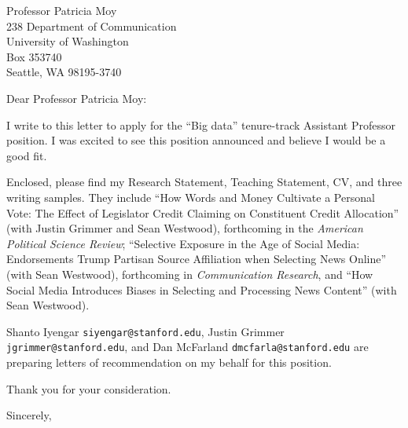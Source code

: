 \documentclass[fontsize=12pt, paper=a4]{scrlttr2}
\begin{document}
\begin{letter}{Professor Patricia Moy \\
238 Department of Communication\\
University of Washington\\
Box 353740\\
Seattle, WA 98195-3740}

\opening{Dear Professor Patricia Moy:}  %

I write to this letter to apply for the ``Big data'' tenure-track Assistant Professor position.  I was excited to see this position announced and believe I would be a good fit.   

Enclosed, please find my Research Statement, Teaching Statement, CV, and three writing samples.  They include ``How Words and Money Cultivate a Personal Vote: The Effect of Legislator Credit Claiming on Constituent Credit Allocation'' (with Justin Grimmer and Sean Westwood), forthcoming in the \emph{American Political Science Review};  ``Selective Exposure in the Age of Social Media: Endorsements Trump Partisan Source Affiliation when Selecting News Online'' (with Sean Westwood), forthcoming in \emph{Communication Research}, and ``How Social Media Introduces Biases in Selecting and Processing News Content'' (with Sean Westwood).  

Shanto Iyengar \texttt{siyengar@stanford.edu}, Justin Grimmer \texttt{jgrimmer@stanford.edu}, and Dan McFarland \texttt{dmcfarla@stanford.edu} are preparing letters of recommendation on my behalf for this position.   

Thank you for your consideration.\\

\closing{Sincerely, \\
}

\end{letter}



\end{document}
